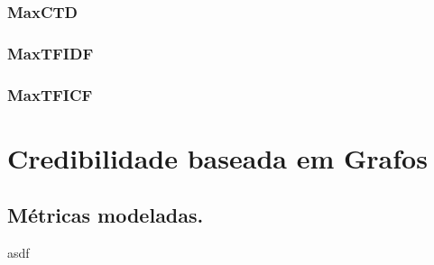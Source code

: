 \subsubsection{MaxCTD}
\label{subsubsection::maxctd}

\subsubsection{MaxTFIDF}
\label{subsubsection::maxtfidf}

\subsubsection{MaxTFICF} 
\label{subsubsection::maxtficf}

\cite{ChihHow04}




\section{Credibilidade baseada em Grafos}
\label{sec::pg_cred_baseada_grafos}

\subsection{Métricas modeladas.}
\label{subsec::pg_metricas_grafos}

asdf

